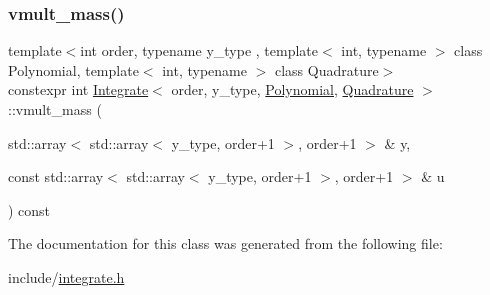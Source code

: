 \mbox{\label{class_integrate_ac76c916feda54370585d288f80802f05}} 
\subsubsection{\texorpdfstring{vmult\+\_\+mass()}{vmult\_mass()}}
{\footnotesize\ttfamily template$<$int order, typename y\+\_\+type , template$<$ int, typename $>$ class Polynomial, template$<$ int, typename $>$ class Quadrature$>$ \\
constexpr int \hyperlink{class_integrate}{Integrate}$<$ order, y\+\_\+type, \hyperlink{class_polynomial}{Polynomial}, \hyperlink{class_quadrature}{Quadrature} $>$\+::vmult\+\_\+mass (\begin{DoxyParamCaption}\item[{std\+::array$<$ std\+::array$<$ y\+\_\+type, order+1 $>$, order+1 $>$ \&}]{y,  }\item[{const std\+::array$<$ std\+::array$<$ y\+\_\+type, order+1 $>$, order+1 $>$ \&}]{u }\end{DoxyParamCaption}) const\hspace{0.3cm}{\ttfamily [inline]}}



The documentation for this class was generated from the following file\+:\begin{DoxyCompactItemize}
\item 
include/\hyperlink{integrate_8h}{integrate.\+h}\end{DoxyCompactItemize}
